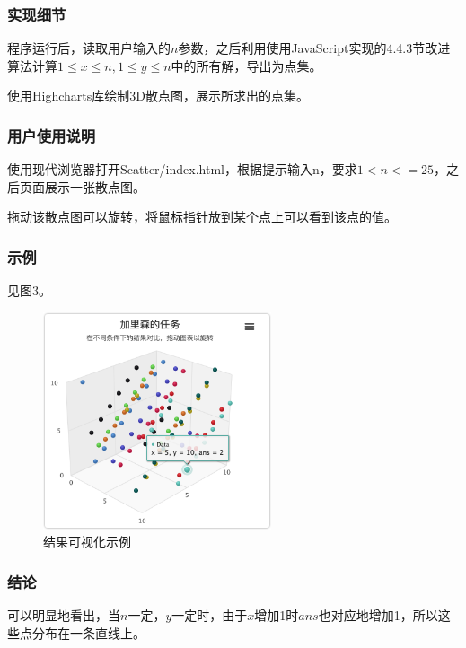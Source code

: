 \documentclass{article}
\begin{document}
\subsubsection{实现细节}

程序运行后，读取用户输入的$n$参数，之后利用使用JavaScript实现的4.4.3节改进算法计算$1 \leq x\leq n,1\leq y\leq n$中的所有解，导出为点集。

使用Highcharts库绘制3D散点图，展示所求出的点集。

\subsubsection{用户使用说明}

使用现代浏览器打开Scatter/index.html，根据提示输入n，要求$1 < n <= 25$，之后页面展示一张散点图。

拖动该散点图可以旋转，将鼠标指针放到某个点上可以看到该点的值。

\subsubsection{示例}

见图3。

\begin{figure}[htbp]
    
    \centering\includegraphics[width=0.6\textwidth]{./Images/Scatter.png}
    
    \caption{结果可视化示例}
    
\end{figure}

\subsubsection{结论}

可以明显地看出，当$n$一定，$y$一定时，由于$x$增加1时$ans$也对应地增加1，所以这些点分布在一条直线上。
\end{document}
